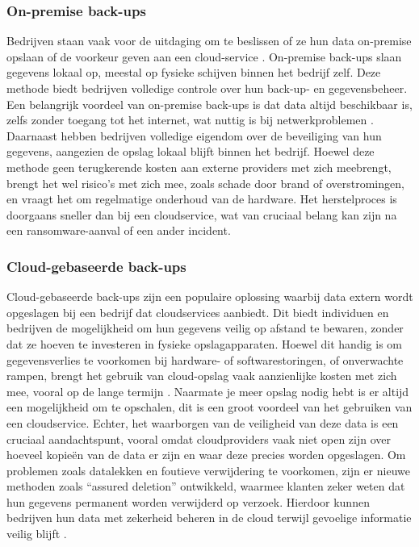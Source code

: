 \subsubsection{On-premise back-ups}
Bedrijven staan vaak voor de uitdaging om te beslissen of ze hun data on-premise opslaan of de voorkeur geven aan een cloud-service \autocite{Ali2024}. On-premise back-ups slaan gegevens lokaal op, meestal op fysieke schijven binnen het bedrijf zelf. Deze methode biedt bedrijven volledige controle over hun back-up- en gegevensbeheer. Een belangrijk voordeel van on-premise back-ups is dat data altijd beschikbaar is, zelfs zonder toegang tot het internet, wat nuttig is bij netwerkproblemen \autocite{Trovato2019}. Daarnaast hebben bedrijven volledige eigendom over de beveiliging van hun gegevens, aangezien de opslag lokaal blijft binnen het bedrijf. Hoewel deze methode geen terugkerende kosten aan externe providers met zich meebrengt, brengt het wel risico’s met zich mee, zoals schade door brand of overstromingen, en vraagt het om regelmatige onderhoud van de hardware. Het herstelproces is doorgaans sneller dan bij een cloudservice, wat van cruciaal belang kan zijn na een ransomware-aanval of een ander incident.
\subsubsection{Cloud-gebaseerde back-ups}
Cloud-gebaseerde back-ups zijn een populaire oplossing waarbij data extern wordt opgeslagen bij een bedrijf dat cloudservices aanbiedt. Dit biedt individuen en bedrijven de mogelijkheid om hun gegevens veilig op afstand te bewaren, zonder dat ze hoeven te investeren in fysieke opslagapparaten. Hoewel dit handig is om gegevensverlies te voorkomen bij hardware- of softwarestoringen, of onverwachte rampen, brengt het gebruik van cloud-opslag vaak aanzienlijke kosten met zich mee, vooral op de lange termijn \autocite{Obrutsky2016}. Naarmate je meer opslag nodig hebt is er altijd een mogelijkheid om te opschalen, dit is een groot voordeel van het gebruiken van een cloudservice. Echter, het waarborgen van de veiligheid van deze data is een cruciaal aandachtspunt, vooral omdat cloudproviders vaak niet open zijn over hoeveel kopieën van de data er zijn en waar deze precies worden opgeslagen. Om problemen zoals datalekken en foutieve verwijdering te voorkomen, zijn er nieuwe methoden zoals ``assured deletion'' ontwikkeld, waarmee klanten zeker weten dat hun gegevens permanent worden verwijderd op verzoek. Hierdoor kunnen bedrijven hun data met zekerheid beheren in de cloud terwijl gevoelige informatie veilig blijft \autocite{Rahumed2011}.


